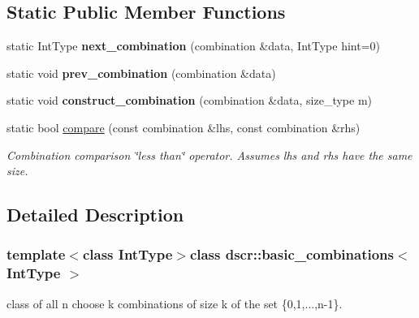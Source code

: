 \subsection*{Static Public Member Functions}
\begin{DoxyCompactItemize}
\item 
\hypertarget{classdscr_1_1basic__combinations_ab82571265bfa7eb54d5f003932a2cb51}{static Int\-Type {\bfseries next\-\_\-combination} (combination \&data, Int\-Type hint=0)}\label{classdscr_1_1basic__combinations_ab82571265bfa7eb54d5f003932a2cb51}

\item 
\hypertarget{classdscr_1_1basic__combinations_ad120a0ed8dd6b229d75d1f7d6f830fca}{static void {\bfseries prev\-\_\-combination} (combination \&data)}\label{classdscr_1_1basic__combinations_ad120a0ed8dd6b229d75d1f7d6f830fca}

\item 
\hypertarget{classdscr_1_1basic__combinations_ab7f0bd474342742eba6ff522bf8589ee}{static void {\bfseries construct\-\_\-combination} (combination \&data, size\-\_\-type m)}\label{classdscr_1_1basic__combinations_ab7f0bd474342742eba6ff522bf8589ee}

\item 
static bool \hyperlink{classdscr_1_1basic__combinations_aa02c3a340a08313d851bca27aa571ba0}{compare} (const combination \&lhs, const combination \&rhs)
\begin{DoxyCompactList}\small\item\em Combination comparison \char`\"{}less than\char`\"{} operator. Assumes lhs and rhs have the same size. \end{DoxyCompactList}\end{DoxyCompactItemize}


\subsection{Detailed Description}
\subsubsection*{template$<$class Int\-Type$>$class dscr\-::basic\-\_\-combinations$<$ Int\-Type $>$}

class of all n choose k combinations of size k of the set \{0,1,...,n-\/1\}. 


